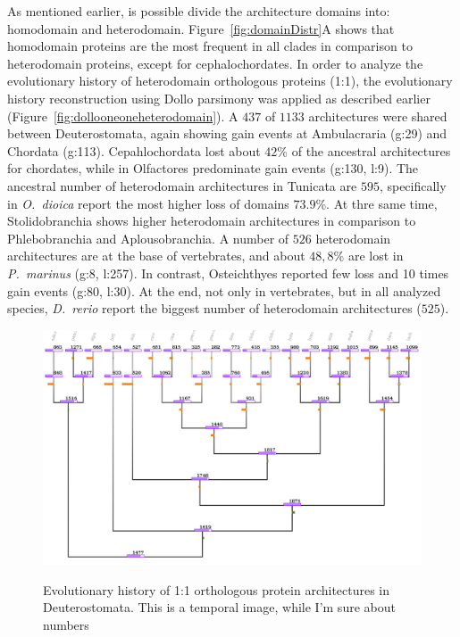 \documentclass[11pt]{article}
\newcommand{\TODO}[1]{\begingroup\color{red}#1\endgroup}
\begin{document}
As mentioned earlier, is possible divide the architecture domains into: homodomain 
and heterodomain. Figure~\ref{fig:domainDistr}A shows that homodomain proteins 
are the most frequent in all clades in comparison to heterodomain proteins, 
except for cephalochordates. In order to analyze the evolutionary history of 
heterodomain orthologous proteins (1:1), the evolutionary history reconstruction 
using Dollo parsimony was applied as described earlier (Figure~\ref{fig:dollooneoneheterodomain}). A $437$ of $1133$ architectures were shared 
between Deuterostomata, again showing gain events at Ambulacraria (g:29) and 
Chordata (g:113). Cepahlochordata lost about $42$\% of the ancestral architectures 
for chordates, while in Olfactores predominate gain events (g:130, l:9). The 
ancestral number of heterodomain architectures in Tunicata are $595$, specifically 
in \textit{O.\ dioica} report the most higher loss of domains $73.9$\%. 
At thre same time, Stolidobranchia shows higher heterodomain architectures in 
comparison to Phlebobranchia and Aplousobranchia. A number of $526$ heterodomain
 architectures are at the base of vertebrates, and about $48,8$\% are lost in 
 \textsl{P.\ marinus} (g:8, l:257). In contrast, Osteichthyes reported few loss and 
 10 times gain events (g:80, l:30). At the end, not only in vertebrates, but in all 
analyzed species, \textit{D.\ rerio} report the biggest number of heterodomain 
architectures ($525$).

\begin{figure}[ht!]
\centering
\includegraphics[scale=0.53]{figures/provisionalDollo} \\
\caption{Evolutionary history of 1:1 orthologous protein architectures in 
Deuterostomata. \TODO{This is a temporal image, while I'm sure about numbers}}
\label{fig:dollooneone}
\end{figure}
\end{document}
